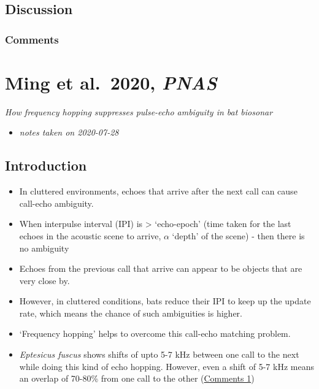 \documentclass[
]{book}
\providecommand{\tightlist}{%
  \setlength{\itemsep}{0pt}\setlength{\parskip}{0pt}}
\begin{document}
\hypertarget{discussion}{%
\section{Discussion}\label{discussion}}

\hypertarget{com_libehav}{%
\subsection{Comments}\label{com_libehav}}

\hypertarget{ming-et-al.-2020-pnas}{%
\chapter{\texorpdfstring{Ming et al.~2020, \emph{PNAS}}{Ming et al.~2020, PNAS}}\label{ming-et-al.-2020-pnas}}


\emph{How frequency hopping suppresses pulse-echo ambiguity in bat biosonar} \citep{Ming17288}

\begin{itemize}
\tightlist
\item
  \emph{notes taken on 2020-07-28}
\end{itemize}

\hypertarget{introduction}{%
\section{Introduction}\label{introduction}}

\begin{itemize}
\tightlist
\item
  In cluttered environments, echoes that arrive after the next call can cause call-echo ambiguity.
\item
  When interpulse interval (IPI) is \textgreater{} `echo-epoch' (time taken for the last echoes in the acoustic scene to arrive, \(\alpha\) `depth' of the scene) - then there is no ambiguity
\item
  Echoes from the previous call that arrive can appear to be objects that are very close by.
\item
  However, in cluttered conditions, bats reduce their IPI to keep up the update rate, which means the chance of such ambiguities is higher.
\item
  `Frequency hopping' helps to overcome this call-echo matching problem.
\item
  \emph{Eptesicus fuscus} shows shifts of upto 5-7 kHz between one call to the next while doing this kind of echo hopping. However, even a shift of 5-7 kHz means an overlap of 70-80\% from one call to the other (\protect\hyperlink{com_ming}{Comments 1})
\end{itemize}
\end{document}
